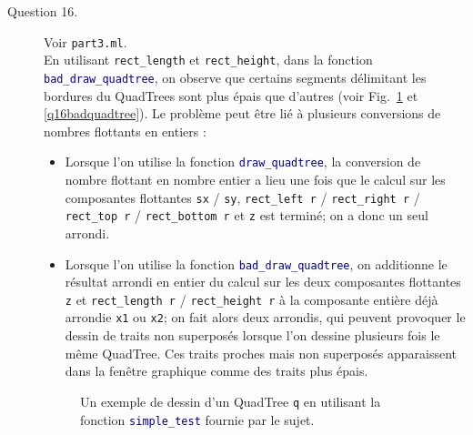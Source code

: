\documentclass[11pt]{scrartcl}
\newcommand{\funname}[1]{\texttt{\textcolor{darkblue}{#1}}}
\newcommand{\filename}[1]{\texttt{\textcolor{darkbrown}{#1}}}
\newcommand{\code}[1]{\texttt{#1}}
\begin{document}
\begin{description}
\item[Question 16.] Voir \filename{part3.ml}.\\
En utilisant \code{rect_length} et \code{rect_height}, dans la fonction \funname{bad_draw_quadtree}, on observe que certains segments délimitant les bordures du QuadTrees sont plus épais que d'autres (voir Fig.~\ref{q16goodquadtree} et \ref{q16badquadtree}). Le problème peut être lié à plusieurs conversions de nombres flottants en entiers :
\begin{itemize}
	\item Lorsque l'on utilise la fonction \funname{draw_quadtree}, la conversion de nombre flottant en nombre entier a lieu une fois que le calcul sur les composantes flottantes \code{sx} / \code{sy}, \code{rect_left r} / \code{rect_right r} / \code{rect_top r} / \code{rect_bottom r} et \code{z} est terminé; on a donc un seul arrondi.
	\item Lorsque l'on utilise la fonction \funname{bad_draw_quadtree}, on additionne le résultat arrondi en entier du calcul sur les deux composantes flottantes \code{z} et \code{rect_length r} / \code{rect_height r} à la composante entière déjà arrondie \code{x1} ou \code{x2}; on fait alors deux arrondis, qui peuvent provoquer le dessin de traits non superposés lorsque l'on dessine plusieurs fois le même QuadTree.
Ces traits proches mais non superposés
apparaissent dans la fenêtre graphique comme des traits plus épais.
\end{itemize}

\begin{figure}[!h]
	\centering
	\caption{\label{q16goodquadtree} Un exemple de dessin d'un QuadTree \code{q} en utilisant la fonction \funname{simple_test} fournie par le sujet.}
\end{figure}


\end{description}
\end{document}
